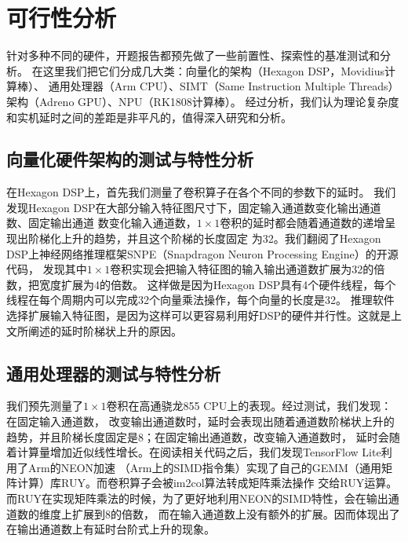 \section{可行性分析}
针对多种不同的硬件，开题报告都预先做了一些前置性、探索性的基准测试和分析。
在这里我们把它们分成几大类：向量化的架构（Hexagon DSP，Movidius计算棒）、
通用处理器（Arm CPU）、SIMT（Same Instruction Multiple Threads）架构（Adreno GPU）、NPU（RK1808计算棒）。
经过分析，我们认为理论复杂度和实机延时之间的差距是非平凡的，值得深入研究和分析。

\subsection{向量化硬件架构的测试与特性分析}
在Hexagon DSP上，首先我们测量了卷积算子在各个不同的参数下的延时。
我们发现Hexagon DSP在大部分输入特征图尺寸下，固定输入通道数变化输出通道数、固定输出通道
数变化输入通道数，$1\times 1$卷积的延时都会随着通道数的递增呈现出阶梯化上升的趋势，并且这个阶梯的长度固定
为32。我们翻阅了Hexagon DSP上神经网络推理框架SNPE（Snapdragon Neuron Processing Engine）的开源代码，
发现其中$1\times 1$卷积实现会把输入特征图的输入输出通道数扩展为32的倍数，把宽度扩展为4的倍数。
这样做是因为Hexagon DSP具有4个硬件线程，每个线程在每个周期内可以完成32个向量乘法操作，每个向量的长度是32。
推理软件选择扩展输入特征图，是因为这样可以更容易利用好DSP的硬件并行性。这就是上文所阐述的延时阶梯状上升的原因。

\subsection{通用处理器的测试与特性分析}
我们预先测量了$1\times 1$卷积在高通骁龙855 CPU上的表现。经过测试，我们发现：在固定输入通道数，
改变输出通道数时，延时会表现出随着通道数阶梯状上升的趋势，并且阶梯长度固定是8；在固定输出通道数，改变输入通道数时，
延时会随着计算量增加近似线性增长。在阅读相关代码之后，我们发现TensorFlow Lite利用了Arm的NEON加速
（Arm上的SIMD指令集）实现了自己的GEMM（通用矩阵计算）库RUY。而卷积算子会被im2col算法转成矩阵乘法操作
交给RUY运算。而RUY在实现矩阵乘法的时候，为了更好地利用NEON的SIMD特性，会在输出通道数的维度上扩展到8的倍数，
而在输入通道数上没有额外的扩展。因而体现出了在输出通道数上有延时台阶式上升的现象。

